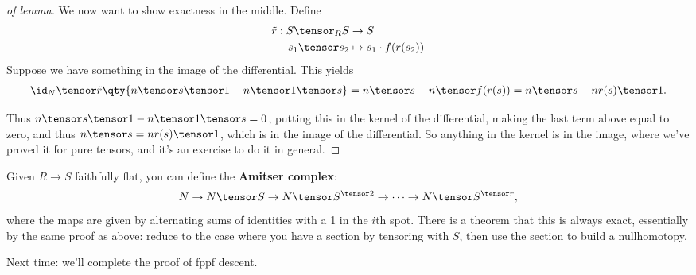 \begin{proof}[of lemma]
We now want to show exactness in the middle. Define
\begin{align*}
\tilde r: S\tensor_R S &\to S \\
s_1 \tensor s_2 &\mapsto s_1 \cdot f(r(s_2))
\end{align*} Suppose we have something in the image of the differential.
This yields
\begin{align*}  
\id_N \tensor \tilde r \qty{n\tensor s\tensor 1 - n\tensor 1 \tensor s}
= n\tensor s - n\tensor f(r(s))
= n\tensor s - nr(s) \tensor 1
.\end{align*}

Thus \(n\tensor s\tensor 1 - n\tensor 1\tensor s = 0\), putting this in
the kernel of the differential, making the last term above equal to
zero, and thus \(n\tensor s = n r(s) \tensor 1\), which is in the image
of the differential. So anything in the kernel is in the image, where
we've proved it for pure tensors, and it's an exercise to do it in
general.

\end{proof}

\begin{remark}

Given \(R\to S\) faithfully flat, you can define the \textbf{Amitser
complex}:
\begin{align*}  
N \to N\tensor S \to N\tensor S^{\tensor 2} \to \cdots \to N\tensor S^{\tensor r}
,\end{align*} where the maps are given by alternating sums of identities
with a 1 in the \(i\)th spot. There is a theorem that this is always
exact, essentially by the same proof as above: reduce to the case where
you have a section by tensoring with \(S\), then use the section to
build a nullhomotopy.

\end{remark}

Next time: we'll complete the proof of fppf descent.

\cleardoublepage

\renewcommand{\listtheoremname}{}
\listoftheorems[ignoreall,show={definition}, numwidth=3.5em]
\cleardoublepage

\renewcommand{\listtheoremname}{}
\listoftheorems[ignoreall,show={theorem,proposition}, numwidth=3.5em]
\cleardoublepage

\renewcommand{\listtheoremname}{}
\listoftheorems[ignoreall,show={exercise}, numwidth=3.5em]
\cleardoublepage

\listoffigures
\cleardoublepage


\printbibliography[title=Bibliography]



